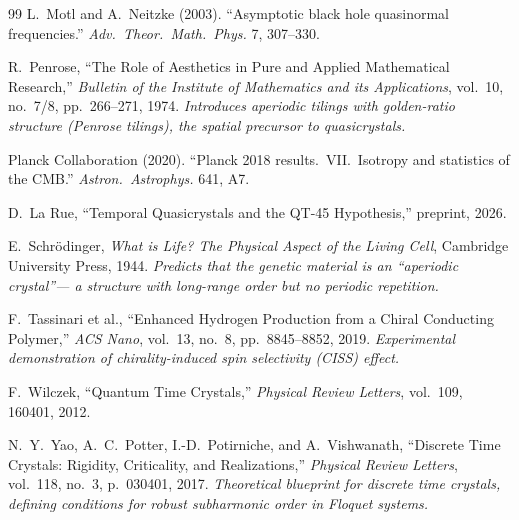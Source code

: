 \begin{thebibliography}{99}
L.~Motl and A.~Neitzke (2003).
``Asymptotic black hole quasinormal frequencies.''
\textit{Adv.\ Theor.\ Math.\ Phys.} 7, 307--330.

R.~Penrose,
``The Role of Aesthetics in Pure and Applied Mathematical Research,''
\emph{Bulletin of the Institute of Mathematics and its Applications},
vol.~10, no.~7/8, pp.~266--271, 1974.
\textit{Introduces aperiodic tilings with golden-ratio structure (Penrose tilings),
the spatial precursor to quasicrystals.}

Planck Collaboration (2020).
``Planck 2018 results.\ VII.\ Isotropy and statistics of the CMB.''
\textit{Astron.\ Astrophys.} 641, A7.

D.~La Rue,
``Temporal Quasicrystals and the QT-45 Hypothesis,''
preprint, 2026.

E.~Schr\"odinger,
\emph{What is Life? The Physical Aspect of the Living Cell},
Cambridge University Press, 1944.
\textit{Predicts that the genetic material is an ``aperiodic crystal''---
a structure with long-range order but no periodic repetition.}

F.~Tassinari et al.,
``Enhanced Hydrogen Production from a Chiral Conducting Polymer,''
\emph{ACS Nano}, vol.~13, no.~8, pp.~8845--8852, 2019.
\textit{Experimental demonstration of chirality-induced spin selectivity (CISS) effect.}

F.~Wilczek,
``Quantum Time Crystals,''
\emph{Physical Review Letters}, vol.~109, 160401, 2012.

N.~Y.~Yao, A.~C.~Potter, I.-D.~Potirniche, and A.~Vishwanath,
``Discrete Time Crystals: Rigidity, Criticality, and Realizations,''
\emph{Physical Review Letters}, vol.~118, no.~3, p.~030401, 2017.
\textit{Theoretical blueprint for discrete time crystals, defining conditions
for robust subharmonic order in Floquet systems.}


\end{thebibliography}
